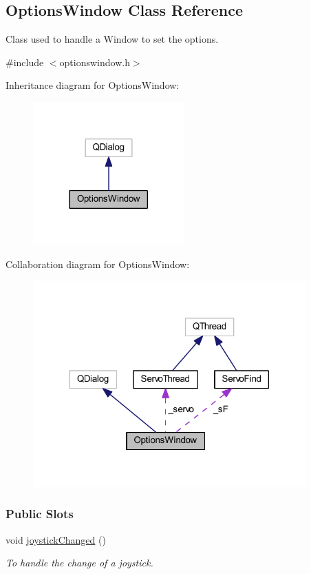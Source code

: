 \hypertarget{a00006}{}\subsection{Options\+Window Class Reference}
\label{a00006}


Class used to handle a Window to set the options.  




{\ttfamily \#include $<$optionswindow.\+h$>$}



Inheritance diagram for Options\+Window\+:\nopagebreak
\begin{figure}[H]
\begin{center}
\leavevmode
\includegraphics[width=165pt]{d1/dc6/a00037}
\end{center}
\end{figure}


Collaboration diagram for Options\+Window\+:\nopagebreak
\begin{figure}[H]
\begin{center}
\leavevmode
\includegraphics[width=297pt]{d8/d41/a00038}
\end{center}
\end{figure}
\subsubsection*{Public Slots}
\begin{DoxyCompactItemize}
\item 
void \hyperlink{a00006_ae8c0373be58da710194f8d14f1c3c4dc}{joystick\+Changed} ()
\begin{DoxyCompactList}\small\item\em To handle the change of a joystick. \end{DoxyCompactList}\end{DoxyCompactItemize}

